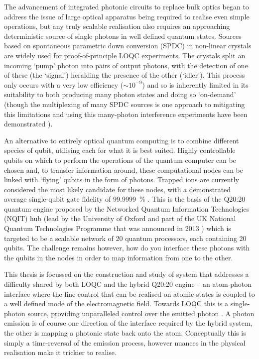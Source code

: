\documentclass[../Thesis-IJspeert.tex]{subfiles}
\begin{document}
The advancement of integrated photonic circuits to replace bulk optics \cite{politi08} began to address the issue of large optical apparatus being required to realise even simple operations, but any truly scalable realisation also requires an approaching deterministic source of single photons in well defined quantum states.  Sources based on spontaneous parametric down conversion (SPDC) in non-linear crystals \cite{motes13} are widely used for proof-of-principle LOQC experiments.  The crystals split an incoming `pump' photon into pairs of output photons, with the detection of one of these (the `signal') heralding the presence of the other (`idler').  This process only occurs with a very low efficiency (${\sim}10^{-9}$) and so is inherently limited in its suitability to both producing many photon states and doing so `on-demand' (though the multiplexing of many SPDC sources is one approach to mitigating this limitations \cite{barz10,ma11, spring17} and using this many-photon interference experiments have been demonstrated \cite{spring15,menssen17}).

An alternative to entirely optical quantum computing is to combine different species of qubit, utilising each for what it is best suited.  Highly controllable qubits on which to perform the operations of the quantum computer can be chosen and, to transfer information around, these computational nodes can be linked with `flying' qubits in the form of photons.  Trapped ions are currently considered the most likely candidate for these nodes, with a demonstrated average single-qubit gate fidelity of \SI{99.9999}{\percent} \cite{harty14}.  This is the basis of the Q20:20 quantum engine proposed by the Networked Quantum Information Technologies (NQIT) hub (lead by the University of Oxford and part of the UK National Quantum Technologies Programme that was announced in 2013 \cite{natEd15}) which is targeted to be a scalable network of 20 quantum processors, each containing 20 qubits.  The challenge remains however, how do you interface these photons with the qubits in the nodes in order to map information from one to the other.

This thesis is focussed on the construction and study of system that addresses a difficulty shared by both LOQC and the hybrid Q20:20 engine -- an atom-photon interface where the fine control that can be realised on atomic states is coupled to a well defined mode of the electromagnetic field.  Towards LOQC this is a single-photon source, providing unparalleled control over the emitted photon \cite{dilley12,nisbet11,barter16,kuhn02,kuhn09,kuhn10}.  A photon emission is of course one direction of the interface required by the hybrid system, the other is mapping a photonic state back onto the atom.  Conceptually this is simply a time-reversal of the emission process, however nuances in the physical realisation make it trickier to realise.\footnotemark{}
\end{document}
